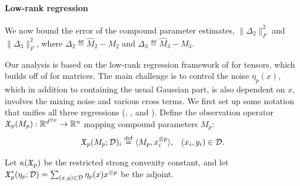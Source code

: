 \paragraph{Low-rank regression}
\vspace{-0.5em}
We now bound the error of
the compound parameter estimates,
$\|\Delta_2\|_F^2$ and $\|\Delta_3\|_F^2$,
where $\Delta_2 \eqdef \hat M_2 - M_2$
and $\Delta_3 \eqdef \hat M_3 - M_3$.

Our analysis is based on the low-rank regression framework of
\citet{Tomioka2011} for tensors, which builds off of
\citet{NegahbanWainwright2009} for matrices.
The main challenge is to control the noise $\eta_p(x)$,
which in addition to containing the usual Gaussian part, is also dependent on
$x$, involves the mixing noise and various cross terms.
We first set up some notation that unifies all three regressions (, , and ).
Define the observation operator $\operatorname{\mathfrak{X}}_p(M_p) : \mathbb{R}^{d^{\otimes p}} \to \mathbb{R}^{n}$
mapping compound parameters $M_p$:
\begin{align}
\operatorname{\mathfrak{X}}_p(M_p; \mathcal{D})_i &\stackrel{\rm def}{=} \langle M_p, x^{\otimes p}_i \rangle, & (x_i, y_i) \in \mathcal{D}.
\end{align}

Let $\kappa(\operatorname{\mathfrak{X}}_p)$ be the restricted strong convexity constant,
and let $\operatorname{\mathfrak{X}}^*_p(\eta_p; \mathcal{D}) = \sum_{(x,y) \in \mathcal{D}} \eta_p(x) x^{\otimes p}$
be the adjoint.





